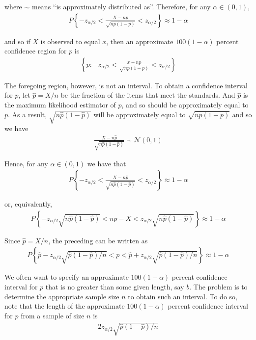 \documentclass[12pt]{article}
\begin{document}
where $\sim$ means ``is approximately distributed as''. Therefore, for any $\alpha \in (0,1)$,
\begin{eqnarray*}
  P \left\{ - z_{\alpha /2} < \frac {X - np}{\sqrt {np(1-p)}}
    < z_{\alpha / 2} \right\} \approx 1 - \alpha
\end{eqnarray*}

and so if $X$ is observed to equal $x$, then an approximate $100(1 - \alpha)$ percent confidence region for $p$ is
\begin{eqnarray*}
  \left\{ p: - z_{\alpha /2} < \frac {x - np}{\sqrt {np(1-p)}}
    < z_{\alpha / 2} \right\}
\end{eqnarray*}

The foregoing region, however, is not an interval. To obtain a confidence interval for $p$, let $\hat{p} = X / n$ be the fraction of the items that meet the standards. And $\hat{p}$ is the maximum likelihood estimator of $p$, and so should be approximately equal to $p$. As a result, $\sqrt{n \hat{p}(1 - \hat{p})}$ will be approximately equal to $\sqrt{np(1-p)}$ and so we have
\begin{eqnarray*}
  \frac {X - n\hat{p}}{\sqrt {n\hat{p}(1-\hat{p})}} \sim \mathcal{N}(0,1)
\end{eqnarray*}

Hence, for any $\alpha \in (0,1)$ we have that
\begin{eqnarray*}
  P \left\{ - z_{\alpha /2} <
    \frac {X - n\hat{p}}{\sqrt {n\hat{p}(1-\hat{p})}}
    < z_{\alpha / 2} \right\} \approx 1 - \alpha
\end{eqnarray*}

or, equivalently,
\begin{eqnarray*}
  P \left\{ - z_{\alpha /2} \sqrt {n\hat{p}(1-\hat{p})} <
    np - X < z_{\alpha /2} \sqrt {n\hat{p}(1-\hat{p})}
  \right\} \approx 1 - \alpha
\end{eqnarray*}

Since $\hat{p} = X/n$, the preceding can be written as
\begin{eqnarray*}
  P \left\{\hat{p} - z_{\alpha /2} \sqrt {\hat{p}(1-\hat{p}) / n} <
    p < \hat{p} + z_{\alpha /2} \sqrt {\hat{p}(1-\hat{p}) / n}
  \right\} \approx 1 - \alpha
\end{eqnarray*}

We often want to specify an approximate $100(1 - \alpha)$ percent confidence interval for $p$ that is no greater than some given length, say $b$. The problem is to determine the appropriate sample size $n$ to obtain such an interval. To do so, note that the length of the approximate $100(1 - \alpha)$ percent confidence interval for $p$ from a sample of size $n$ is
\begin{eqnarray*}
  2 z_{\alpha / 2} \sqrt {\hat{p} (1 - \hat{p}) / n}
\end{eqnarray*}
\end{document}
